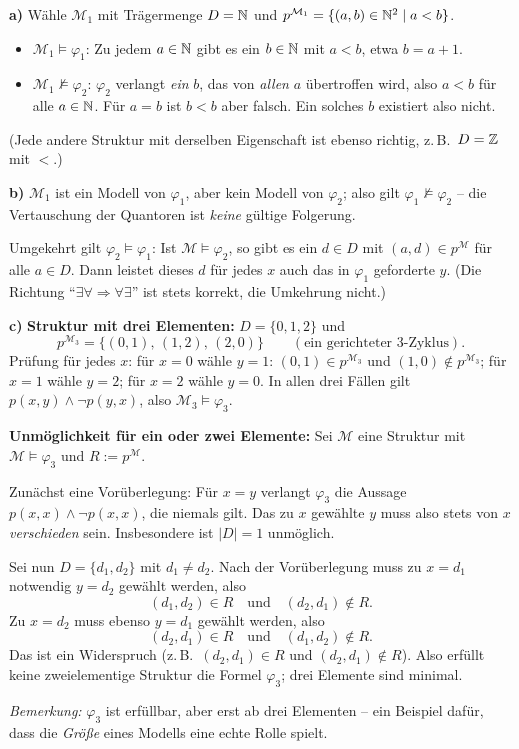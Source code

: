 \begin{loesung}
\textbf{a)} Wähle $\mathcal{M}_1$ mit Trägermenge $D=\mathbb{N}$ und $p^{\mathcal{M}_1} = \{(a,b)\in\mathbb{N}^2 \mid a < b\}$.
\begin{itemize}
  \item $\mathcal{M}_1\models\varphi_1$: Zu jedem $a\in\mathbb{N}$ gibt es ein $b\in\mathbb{N}$ mit $a<b$, etwa $b=a+1$.
  \item $\mathcal{M}_1\not\models\varphi_2$: $\varphi_2$ verlangt \emph{ein} $b$, das von \emph{allen} $a$ übertroffen wird, also $a<b$ für alle $a\in\mathbb{N}$. Für $a=b$ ist $b<b$ aber falsch. Ein solches $b$ existiert also nicht.
\end{itemize}
(Jede andere Struktur mit derselben Eigenschaft ist ebenso richtig, z.\,B.\ $D=\mathbb{Z}$ mit $<$.)

\textbf{b)} $\mathcal{M}_1$ ist ein Modell von $\varphi_1$, aber kein Modell von $\varphi_2$; also gilt
$\varphi_1\not\models\varphi_2$ -- die Vertauschung der Quantoren ist \emph{keine} gültige Folgerung.

Umgekehrt gilt $\varphi_2\models\varphi_1$: Ist $\mathcal{M}\models\varphi_2$, so gibt es ein $d\in D$ mit $(a,d)\in p^{\mathcal{M}}$ für alle $a\in D$. Dann leistet dieses $d$ für jedes $x$ auch das in $\varphi_1$ geforderte $y$. (Die Richtung \enquote{$\exists\forall \Rightarrow \forall\exists$} ist stets korrekt, die Umkehrung nicht.)

\textbf{c)} \textbf{Struktur mit drei Elementen:} $D=\{0,1,2\}$ und
\[
  p^{\mathcal{M}_3} = \{(0,1),\,(1,2),\,(2,0)\} \qquad (\text{ein gerichteter 3-Zyklus}).
\]
Prüfung für jedes $x$: für $x=0$ wähle $y=1$: $(0,1)\in p^{\mathcal{M}_3}$ und $(1,0)\notin p^{\mathcal{M}_3}$; für $x=1$ wähle $y=2$; für $x=2$ wähle $y=0$. In allen drei Fällen gilt $p(x,y)\wedge\neg p(y,x)$, also $\mathcal{M}_3\models\varphi_3$.

\textbf{Unmöglichkeit für ein oder zwei Elemente:} Sei $\mathcal{M}$ eine Struktur mit $\mathcal{M}\models\varphi_3$ und $R:=p^{\mathcal{M}}$.

Zunächst eine Vorüberlegung: Für $x=y$ verlangt $\varphi_3$ die Aussage $p(x,x)\wedge\neg p(x,x)$, die niemals gilt. Das zu $x$ gewählte $y$ muss also stets von $x$ \emph{verschieden} sein. Insbesondere ist $|D|=1$ unmöglich.

Sei nun $D=\{d_1,d_2\}$ mit $d_1\neq d_2$. Nach der Vorüberlegung muss zu $x=d_1$ notwendig $y=d_2$ gewählt werden, also
\[
  (d_1,d_2)\in R \quad\text{und}\quad (d_2,d_1)\notin R.
\]
Zu $x=d_2$ muss ebenso $y=d_1$ gewählt werden, also
\[
  (d_2,d_1)\in R \quad\text{und}\quad (d_1,d_2)\notin R.
\]
Das ist ein Widerspruch (z.\,B.\ $(d_2,d_1)\in R$ und $(d_2,d_1)\notin R$). Also erfüllt keine zweielementige Struktur die Formel $\varphi_3$; drei Elemente sind minimal.

\textit{Bemerkung:} $\varphi_3$ ist erfüllbar, aber erst ab drei Elementen -- ein Beispiel dafür, dass die \emph{Größe} eines Modells eine echte Rolle spielt.
\end{loesung}

